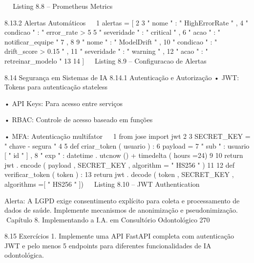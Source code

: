                                                                                         
                                  Listing 8.8 – Prometheus Metrics


     8.13.2     Alertas Automáticos
                                                                                        
 1 alertas    = [
 2     {
 3            " nome " : " HighErrorRate " ,
 4            " condicao " : " error_rate > 5%
 5            " severidade " : " critical " ,
 6            " acao " : " notificar_equipe "
 7     },
 8     {
 9            " nome " : " ModelDrift " ,
10            " condicao " : " drift_score > 0.15 " ,
11            " severidade " : " warning " ,
12            " acao " : " retreinar_modelo "
13     }
14 ]
                                                                                        
                                Listing 8.9 – Configuracao de Alertas



     8.14      Segurança em Sistemas de IA
     8.14.1     Autenticação e Autorização
         • JWT: Tokens para autenticação stateless

         • API Keys: Para acesso entre serviços

         • RBAC: Controle de acesso baseado em funções

         • MFA: Autenticação multifator
                                                                                        
 1   from jose import jwt
 2
 3   SECRET_KEY = " chave - segura "
 4
 5   def criar_token ( usuario ) :
 6       payload = {
 7           " sub " : usuario [ " id " ] ,
 8           " exp " : datetime . utcnow () + timedelta ( hours =24)
 9       }
10       return jwt . encode ( payload , SECRET_KEY , algorithm = " HS256 " )
11
12   def verificar_token ( token ) :
13       return jwt . decode ( token , SECRET_KEY , algorithms =[ " HS256 " ])
                                                                                        
                                  Listing 8.10 – JWT Authentication


         Alerta: A LGPD exige consentimento explícito para coleta e processamento de
         dados de saúde. Implemente mecanismos de anonimização e pseudonimização.
Capítulo 8. Implementando a I.A. em Consultório Odontológico                    270


8.15      Exercícios
  1. Implemente uma API FastAPI completa com autenticação JWT e pelo menos 5
     endpoints para diferentes funcionalidades de IA odontológica.

